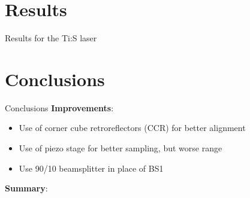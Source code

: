 \documentclass[11pt]{beamer}
\begin{document}
\section{Results}
\begin{frame}{Results for the Ti:S laser}

\end{frame}
\section{Conclusions}
\begin{frame}{Conclusions}
\textbf{Improvements}:\\
	\begin{itemize}
		\item Use of corner cube retroreflectors (CCR) for better alignment
		\item Use of piezo stage for better sampling, but worse range
		\item Use 90/10 beamsplitter in place of BS1
	\end{itemize}
	
	\vspace{5pt}
\textbf{Summary}:\\
	
\end{frame}
\end{document}

